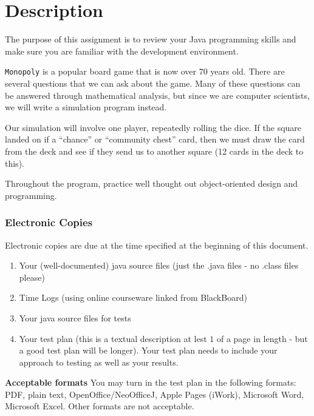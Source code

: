 \documentclass[11pt]{exam}
\begin{document}
	\begin{center} 
	\end{center} 

\lstset{language=Python,numbers=left}

\vspace{0.1in} 

\section*{Description}
The purpose of this assignment is to review your Java programming skills and make sure you are familiar with the development environment.  
\par
{\tt Monopoly} is a popular board game that is now over 70 years old.   There are several questions that we can ask about the game.   Many of these questions can be answered through mathematical analysis, but since we are computer scientists, we will write a simulation program instead.
\par
Our simulation will involve one player, repeatedly rolling the dice.   If the square landed on if a ``chance'' or ``community chest'' card, then we must draw the card from the deck and see if they send us to another square (12 cards in the deck to this).
\par
Throughout the program, practice well thought out object-oriented design and programming.

\subsubsection*{Electronic Copies}
Electronic copies are due at the time specified at the beginning of this document.
\begin{enumerate}
   \item Your (well-documented) java source files (just the .java files - no .class files please)
   \item Time Logs (using online courseware linked from BlackBoard)
   \item Your java source files for tests
   \item Your test plan (this is a textual description at lest $1$ of a page in length - but a good test plan will be longer).  Your test plan needs to include your approach to testing as well as your results.
\end{enumerate}
{\bf Acceptable formats} You may turn in the test plan in the following formats: PDF, plain text, OpenOffice/NeoOfficeJ, Apple Pages (iWork), Microsoft Word, Microsoft Excel.  Other formats are not acceptable. 
\end{document}
